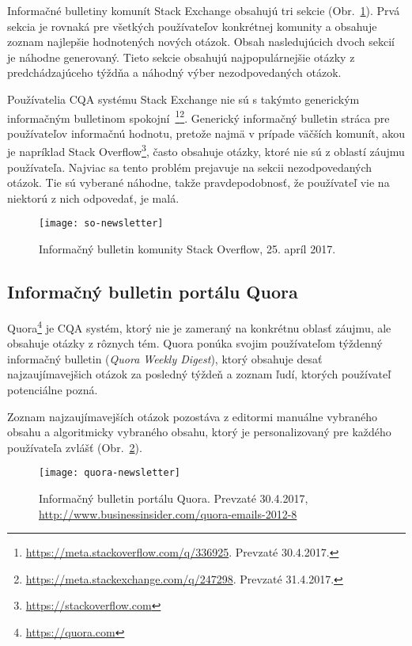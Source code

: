 Informačné bulletiny komunít Stack Exchange obsahujú tri sekcie (Obr.~\ref{fig:so-newsletter}). Prvá sekcia je rovnaká
pre všetkých používateľov konkrétnej komunity a obsahuje zoznam najlepšie hodnotených nových otázok.
Obsah nasledujúcich dvoch sekcií je náhodne generovaný. Tieto sekcie obsahujú najpopulárnejšie otázky z predchádzajúceho
týždňa a náhodný výber nezodpovedaných otázok.

Používatelia CQA systému Stack Exchange nie sú s takýmto generickým informačným bulletinom
spokojní~\footnote{ \url{https://meta.stackoverflow.com/q/336925}. Prevzaté 30.4.2017.}\footnote{
\url{https://meta.stackexchange.com/q/247298}. Prevzaté 31.4.2017.}.
Generický informačný bulletin stráca pre používateľov informačnú hodnotu, pretože
najmä v prípade väčších komunít, akou je napríklad Stack Overflow\footnote{ \url{https://stackoverflow.com}}, často obsahuje
otázky, ktoré nie sú z oblastí záujmu používateľa. Najviac sa tento problém prejavuje na sekcii nezodpovedaných otázok.
Tie sú vyberané náhodne, takže pravdepodobnosť, že používateľ vie na niektorú z nich odpovedať, je malá.


\begin{figure}[H]\begin{center}
\texttt{[image: so-newsletter]}
\caption{Informačný bulletin komunity Stack Overflow, 25. apríl 2017.\label{fig:so-newsletter}}\end{center}
\end{figure}

\subsection{Informačný bulletin portálu Quora}

Quora\footnote{\url{https://quora.com}} je CQA systém, ktorý nie je zameraný na konkrétnu oblasť záujmu, ale obsahuje
otázky z rôznych tém. Quora ponúka svojim používateľom týždenný informačný bulletin (\emph{Quora Weekly Digest}),
ktorý obsahuje desať najzaujímavejšich otázok za posledný týždeň a zoznam ľudí, ktorých používateľ potenciálne pozná.

Zoznam najzaujímavejších otázok pozostáva z editormi manuálne vybraného obsahu a algoritmicky vybraného obsahu,
ktorý je personalizovaný pre každého používateľa zvlášť (Obr.~\ref{fig:quora-newsletter}).

\begin{figure}[H]\begin{center}
\texttt{[image: quora-newsletter]}
\caption{Informačný bulletin portálu Quora. Prevzaté 30.4.2017, \url{http://www.businessinsider.com/quora-emails-2012-8}
\label{fig:quora-newsletter}}\end{center}
\end{figure}

